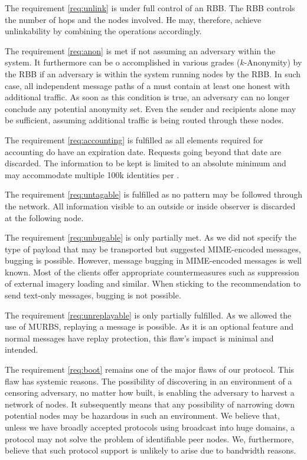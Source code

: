 The requirement \ref{req:unlink} is under full control of an RBB. The RBB controls the number of hops and the nodes involved. He may, therefore, achieve unlinkability by combining the operations accordingly.

The requirement \ref{req:anon} is met if not assuming an adversary within the system. It furthermore can be o accomplished in various grades ($k$-Anonymity) by the RBB if an adversary is within the system running nodes by the RBB. In such case, all independent message paths of a \VortexMessage{} must contain at least one honest \VortexNode{} with additional traffic. As soon as this condition is true, an adversary can no longer conclude any potential anonymity set. Even the sender and recipients alone may be sufficient, assuming additional traffic is being routed through these nodes.

The requirement \ref{req:accounting} is fulfilled as all elements required for accounting do have an expiration date. Requests going beyond that date are discarded. The information to be kept is limited to an absolute minimum and may accommodate multiple 100k identities per \VortexNode.

The requirement \ref{req:untagable} is fulfilled as no pattern may be followed through the network. All information visible to an outside or inside observer is discarded at the following node.

The requirement \ref{req:unbugable} is only partially met. As we did not specify the type of payload that may be transported but suggested MIME-encoded messages, bugging is possible. However, message bugging in MIME-encoded messages is well known. Most of the clients offer appropriate countermeasures such as suppression of external imagery loading and similar. When sticking to the recommendation to send text-only messages, bugging is not possible.

The requirement \ref{req:unreplayable} is only partially fulfilled. As we allowed the use of MURBS, replaying a message is possible. As it is an optional feature and normal messages have replay protection, this flaw's impact is minimal and intended.

The requirement \ref{req:boot} remains one of the major flaws of our protocol. This flaw has systemic reasons. The possibility of discovering \VortexNodes{} in an environment of a censoring adversary, no matter how built, is enabling the adversary to harvest a network of nodes. It subsequently means that any possibility of narrowing down potential nodes may be hazardous in such an environment. We believe that, unless we have broadly accepted protocols using broadcast into huge domains, a protocol may not solve the problem of identifiable peer nodes. We, furthermore, believe that such protocol support is unlikely to arise due to bandwidth reasons. 

